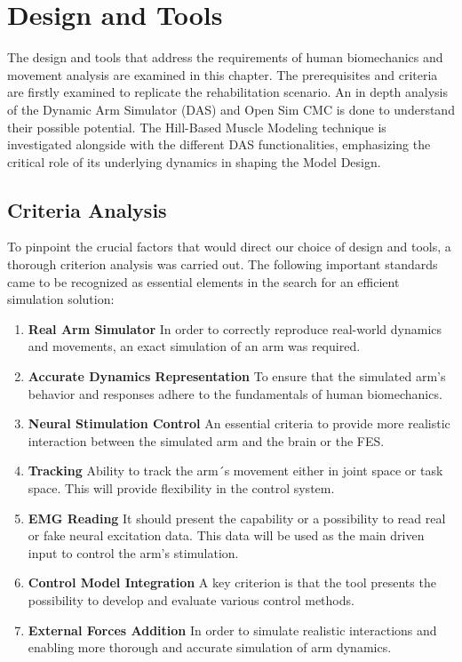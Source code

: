 \chapter{Design and Tools}
The design and tools that address the requirements of human biomechanics and movement analysis are examined in this chapter. The prerequisites and criteria are firstly examined to replicate the rehabilitation scenario. An in depth analysis of the Dynamic Arm Simulator (DAS) and Open Sim CMC is done to understand their possible potential. The Hill-Based Muscle Modeling technique is investigated alongside with the different DAS functionalities, emphasizing the critical role of its underlying dynamics in shaping the Model Design.

\section{Criteria Analysis}

To pinpoint the crucial factors that would direct our choice of design and tools, a thorough criterion analysis was carried out. The following important standards came to be recognized as essential elements in the search for an efficient simulation solution:

\begin{enumerate}
    \item \textbf{Real Arm Simulator} In order to correctly reproduce real-world dynamics and movements, an exact simulation of an arm was required.
    \item \textbf{Accurate Dynamics Representation} To ensure that the simulated arm's behavior and responses adhere to the fundamentals of human biomechanics.
    \item \textbf{Neural Stimulation Control} An essential criteria to provide more realistic interaction between the simulated arm and the brain or the FES.
    \item \textbf{Tracking} Ability to track the arm´s movement either in joint space or task space. This will provide flexibility in the control system.
    \item \textbf{EMG Reading} It should present the capability or a possibility to read real or fake neural excitation data. This data will be used as the main driven input to control the arm's stimulation.
    \item \textbf{Control Model Integration} A key criterion is that the tool presents the possibility to develop and evaluate various control methods.
    \item \textbf{External Forces Addition} In order to simulate realistic interactions and enabling more thorough and accurate simulation of arm dynamics.
    
\end{enumerate}



